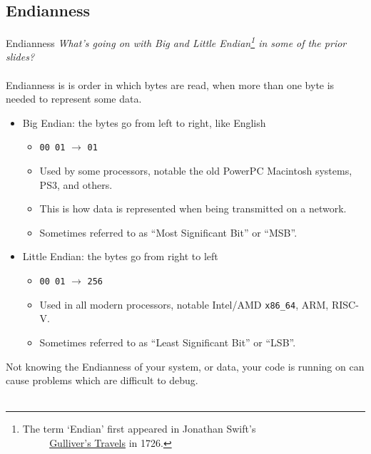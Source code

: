 \documentclass{beamer}
\begin{document}
\subsection{Endianness}
\begin{frame}{Endianness}
    \textit{What's going on with Big and Little Endian\footnote{The term `Endian' first appeared in Jonathan Swift's \\ ~~ ~~ \underline{Gulliver's Travels} in 1726.} in some of the prior slides?} \\
    ~~ \\
    Endianness is is order in which bytes are read, when more than one byte is needed to represent some data. \\
    \begin{itemize}
        \item Big Endian: the bytes go from left to right, like English
        \begin{itemize}
            \item \texttt{00 01} $\rightarrow$ \texttt{01}
            \item Used by some processors, notable the old PowerPC Macintosh systems, PS3, and others.
            \item This is how data is represented when being transmitted on a network.
            \item Sometimes referred to as ``Most Significant Bit'' or ``MSB''.
        \end{itemize}
        \item Little Endian: the bytes go from right to left
        \begin{itemize}
            \item \texttt{00 01} $\rightarrow$ \texttt{256}
            \item Used in all modern processors, notable Intel/AMD \texttt{x86\_64}, ARM, RISC-V.
            \item Sometimes referred to as ``Least Significant Bit'' or ``LSB''.
        \end{itemize}
    \end{itemize}
    Not knowing the Endianness of your system, or data, your code is running on can cause problems which are difficult to debug. \\
    ~~
\end{frame}
\end{document}
